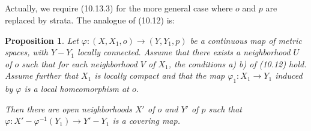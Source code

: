 \documentclass[12pt,a4paper]{article}
\theoremstyle{plain}
\newtheorem{proposition}[theorem]{Proposition}
\theoremstyle{definition}
\theoremstyle{remark}
\begin{document}
\subsection{}
\label{10.15}

Actually, we require (10.13.3) for the more general case where $o$ and $p$ are replaced by strata. The analogue of (10.12) is:

\begin{proposition}
\label{10.15.1}
Let $\varphi : (X, X_1, o) \to (Y, Y_1, p)$ be a continuous map of metric spaces, with $Y - Y_1$ locally connected. Assume that there exists a neighborhood $U$ of $o$ such that for each neighborhood $V$ of $X_1$, the conditions a) b) of (10.12) hold. Assume further that $X_1$ is locally compact and that the map $\varphi_1 : X_1 \to Y_1$ induced by $\varphi$ is a local homeomorphism at $o$.

Then there are open neighborhoods $X'$ of $o$ and $Y'$ of $p$ such that $\varphi : X' - \varphi^{-1}(Y_1) \to Y' - Y_1$ is a covering map.
\end{proposition}
\end{document}
